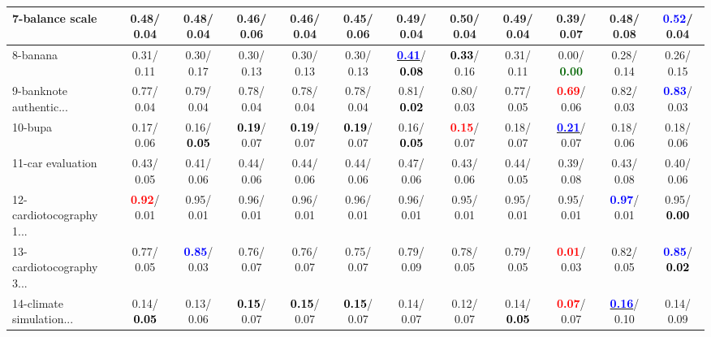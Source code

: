 \begin{table}[h]
\begin{center}
{\begin{tabular}{lc|c|c|c|c|c|c|c|c|c|c}
7-balance scale &   0.48/  0.04 &   0.48/  0.04 &   0.46/  0.06 &   0.46/  0.04 &   0.45/  0.06 &   0.49/  0.04 &   0.50/  0.04 &   0.49/  0.04 &   0.39/  0.07 &   0.48/  0.08 & \textcolor{blue}{\textbf{  0.52}}/  0.04 \\ \hline
8-banana &   0.31/  0.11 &   0.30/  0.17 &   0.30/  0.13 &   0.30/  0.13 &   0.30/  0.13 & \underline{\textcolor{blue}{\textbf{  0.41}}}/\textcolor{black}{\textbf{  0.08}} & \textcolor{black}{\textbf{  0.33}}/  0.16 &   0.31/  0.11 &   0.00/\textcolor{darkgreen}{\textbf{  0.00}} &   0.28/  0.14 &   0.26/  0.15 \\
9-banknote authentic... &   0.77/  0.04 &   0.79/  0.04 &   0.78/  0.04 &   0.78/  0.04 &   0.78/  0.04 &   0.81/\textcolor{black}{\textbf{  0.02}} &   0.80/  0.03 &   0.77/  0.05 & \textcolor{red}{\textbf{  0.69}}/  0.06 &   0.82/  0.03 & \textcolor{blue}{\textbf{  0.83}}/  0.03 \\
10-bupa &   0.17/  0.06 &   0.16/\textcolor{black}{\textbf{  0.05}} & \textcolor{black}{\textbf{  0.19}}/  0.07 & \textcolor{black}{\textbf{  0.19}}/  0.07 & \textcolor{black}{\textbf{  0.19}}/  0.07 &   0.16/\textcolor{black}{\textbf{  0.05}} & \textcolor{red}{\textbf{  0.15}}/  0.07 &   0.18/  0.07 & \underline{\textcolor{blue}{\textbf{  0.21}}}/  0.07 &   0.18/  0.06 &   0.18/  0.06 \\
11-car evaluation &   0.43/  0.05 &   0.41/  0.06 &   0.44/  0.06 &   0.44/  0.06 &   0.44/  0.06 &   0.47/  0.06 &   0.43/  0.06 &   0.44/  0.05 &   0.39/  0.08 &   0.43/  0.08 &   0.40/  0.06 \\
12-cardiotocography 1... & \textcolor{red}{\textbf{  0.92}}/  0.01 &   0.95/  0.01 &   0.96/  0.01 &   0.96/  0.01 &   0.96/  0.01 &   0.96/  0.01 &   0.95/  0.01 &   0.95/  0.01 &   0.95/  0.01 & \textcolor{blue}{\textbf{  0.97}}/  0.01 &   0.95/\textcolor{black}{\textbf{  0.00}} \\
13-cardiotocography 3... &   0.77/  0.05 & \textcolor{blue}{\textbf{  0.85}}/  0.03 &   0.76/  0.07 &   0.76/  0.07 &   0.75/  0.07 &   0.79/  0.09 &   0.78/  0.05 &   0.79/  0.05 & \textcolor{red}{\textbf{  0.01}}/  0.03 &   0.82/  0.05 & \textcolor{blue}{\textbf{  0.85}}/\textcolor{black}{\textbf{  0.02}} \\
14-climate simulation... &   0.14/\textcolor{black}{\textbf{  0.05}} &   0.13/  0.06 & \textcolor{black}{\textbf{  0.15}}/  0.07 & \textcolor{black}{\textbf{  0.15}}/  0.07 & \textcolor{black}{\textbf{  0.15}}/  0.07 &   0.14/  0.07 &   0.12/  0.07 &   0.14/\textcolor{black}{\textbf{  0.05}} & \textcolor{red}{\textbf{  0.07}}/  0.07 & \underline{\textcolor{blue}{\textbf{  0.16}}}/  0.10 &   0.14/  0.09 \\ \hline

\end{tabular}}
\end{center}
\end{table}
